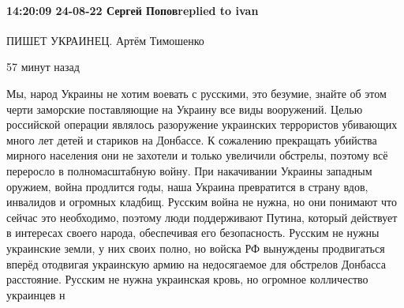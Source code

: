  
 
 
 
 

\paragraph{14:20:09 24-08-22 Сергей Поповreplied to ivan}

ПИШЕТ УКРАИНЕЦ. Артём Тимошенко

57 минут назад

Мы, народ Украины не хотим воевать с русскими, это безумие, знайте об этом черти заморские поставляющие на Украину все виды вооружений. Целью российской операции являлось разоружение украинских террористов убивающих много лет детей и стариков на Донбассе. К сожалению прекращать убийства мирного населения они не захотели и только увеличили обстрелы, поэтому всё переросло в полномасштабную войну. При накачивании Украины западным оружием, война продлится годы, наша Украина превратится в страну вдов, инвалидов и огромных кладбищ. Русским война не нужна, но они понимают что сейчас это необходимо, поэтому люди поддерживают Путина, который действует в интересах своего народа, обеспечивая его безопасность. Русским не нужны украинские земли, у них своих полно, но войска РФ вынуждены продвигаться вперёд отодвигая украинскую армию на недосягаемое для обстрелов Донбасса расстояние. Русским не нужна украинская кровь, но огромное колличество украинцев н
